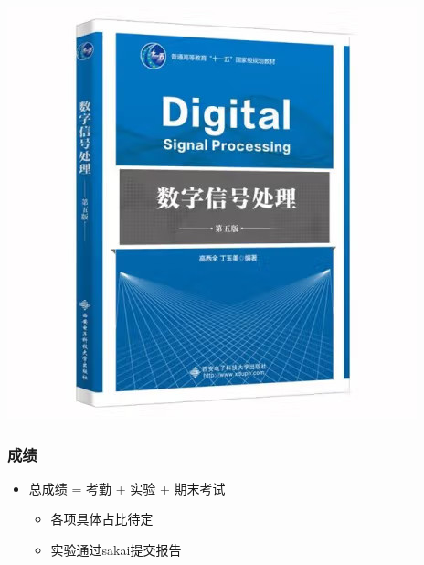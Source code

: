 \documentclass[CJKutf8,xcolor=pdftex,dvipsnames,table]{beamer}
\begin{document}
\begin{CJK*}{UTF8}{song}
\begin{frame}
\begin{center}
      \hspace{1mm}
      \includegraphics[scale=.25]{gaodsp}
    \end{center}
  \end{frame}
  
  \begin{frame}
    \frametitle{成绩}
    \begin{itemize}
    \item 总成绩 = 考勤 + 实验 + 期末考试
        \begin{itemize}   
        \item 各项具体占比待定
        \item 实验通过sakai提交报告 
        \end{itemize}
    \end{itemize}
  \end{frame}


\end{CJK*}
\end{document}
